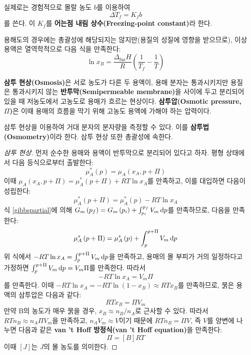         \par 실제로는 경험적으로 몰랄 농도 $b$를 이용하여 
        \begin{equation*}
            \Delta T_f = K_f b
        \end{equation*}
        를 쓴다. 이 $K_f$를 \textbf{어는점 내림 상수(Freezing-point constant)}라 한다.
        \par 용해도의 경우에는 총괄성에 해당되지는 않지만(용질의 성질에 영향을 받으므로), 이상 용액은 열역학적으로 다음 식을 만족한다:
        \begin{equation*}
            \ln{x_B}=\frac{\Delta_\mathrm{fus}H}{R}\left(\frac{1}{T_f}-\frac{1}{T}\right)
        \end{equation*}
        \begin{defn}
        \textbf{삼투 현상(Osmosis)}은 서로 농도가 다른 두 용액이, 용매 분자는 통과시키지만 용질은 통과시키지 않는 \textbf{반투막(Semipermeable membrane)}을 사이에 
        두고 분리되어 있을 때 저농도에서 고농도로 용매가 흐르는 현상이다. \textbf{삼투압(Osmotic pressure, $\Pi$)}은 이때 용매의 흐름을 막기 위해 고농도 용액에 
        가해야 하는 압력이다.
        \end{defn}
        삼투 현상을 이용하여 거대 분자의 분자량을 측정할 수 있다. 이를 \textbf{삼투법(Osmometry)}이라 한다. 삼투 현상 또한 총괄성에 속한다. 
        \begin{proof}[삼투 현상]
        먼저 순수한 용매와 용액이 반투막으로 분리되어 있다고 하자. 평형 상태에서 다음 등식으로부터 출발한다:
        $$
        \mu_A^\ast\left(p\right)=\mu_A\left(x_A,p+\Pi\right)
        $$
        이때 $\mu_A\left(x_A,p+\Pi\right)=\mu_A^\ast\left(p+\Pi\right)+RT\ln{x_A}$를 만족하고, 이를 대입하면 다음이 성립한다:
        $$
        \mu_A^\ast\left(p+\Pi\right)=\mu_A^\ast\left(p\right)-RT\ln{x_A}
        $$
        식 \ref{gibbspartial}에 의해 $G_m\left(p_f\right)=G_m\left(p_i\right)+\int_{p_i}^{p_f}V_m \operatorname{d\!} p$를 만족하므로, 다음을 
        만족한다:
        $$
        \mu_A^\ast \left(p+\Pi\right)=\mu_A^\ast\left(p\right) + \int_{p}^{p+\Pi}V_m \operatorname{d\!} p
        $$
        위 식에서 $-RT \ln{x_A}=\int_{p}^{p+\Pi}V_m \operatorname{d\!} p$을 만족하고, 용매의 몰 부피가 거의 일정하다고 가정하면 
        $\int_{p}^{p+\Pi}V_m\operatorname{d\!} p = V_m \Pi$를 만족한다. 따라서
        $$
        -RT\ln{x_A}=V_m\Pi
        $$
        를 만족한다. 이때 $-RT\ln{x_A} = -RT\ln{\left(1-x_B\right)} \approx RTx_B$를 만족하므로, 묽은 용액의 삼투압은 다음과 같다:
        \begin{equation*}
            RTx_B=\Pi V_m
        \end{equation*}
        만약 B의 농도가 매우 묽을 경우, $x_B \approx n_B/n_A$로 근사할 수 있다. 따라서 $RT n_B \approx n_A \Pi V_m$을 만족하고, 
        $n_A V_m \approx V$이기 때문에 $RT n_B = \Pi V$, 즉 $V$를 양변에 나누면 다음과 같은 \textbf{van 't Hoff 방정식(van 't Hoff equation)}을 
        만족한다:
        \begin{equation*}
            \Pi = \left[ B \right]RT
        \end{equation*}
        이때 $\left[ J \right]$는 $J$의 몰 농도를 의미한다.
        \end{proof}

